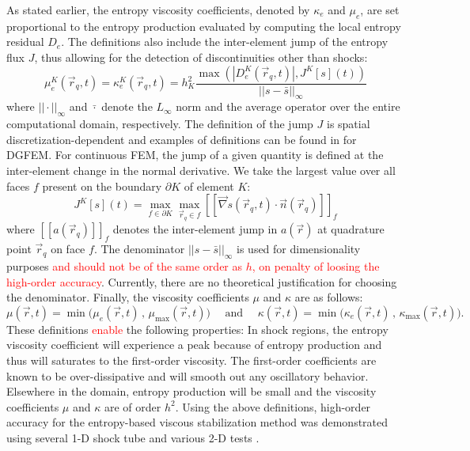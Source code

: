 \documentclass[preprint,10pt]{elsarticle}
\newcommand{\grad}{\vec{\nabla}}
\newcommand{\jmp}[1]{[\![#1]\!]}                     %
\newcommand{\tcr}[1]{\textcolor{red}{#1}}
\begin{document}
As stated earlier, the entropy viscosity coefficients, denoted by $\kappa_e$ and $\mu_e$, are set proportional to the entropy production evaluated by computing the local entropy residual $D_e$. The definitions also include the inter-element jump of the entropy flux $J$, thus allowing for the detection of discontinuities other than shocks:
%
\begin{equation}
\label{eq:ent_visc_coeff}
\mu^K_e(\vec{r}_q,t) = \kappa^K_e(\vec{r}_q,t) = h_K^2 \frac{\max\left( | D^K_e(\vec{r}_q,t) |, J^K[s](t) \right)}{|| s - \bar{s} ||_\infty} 
\end{equation}
%
where $|| \cdot ||_\infty$ and $\bar{\cdot}$ denote the $L_\infty$ norm and the average operator over the entire computational domain, respectively. The definition of the jump $J$ is spatial discretization-dependent and examples of definitions can be found in \cite{valentin} for DGFEM. For continuous FEM, the jump of a given quantity is defined at the inter-element change in the normal derivative. We take the largest value over all faces $f$ present on the boundary $\partial K$ of element $K$:
%
\begin{equation}
\label{eq:jump_CFEM}
J^K[s](t) = \max_{f\in\partial K}  \max_{\vec{r}_q \in f} \jmp{\grad s(\vec{r}_q,t) \cdot \vec{n}(\vec{r}_q) }_f
\end{equation}
%
where $\jmp{a(\vec{r}_q)}_f$ denotes the inter-element jump in $a(\vec{r})$ at quadrature point $\vec{r}_q$ on face $f$.  
The denominator $|| s - \bar{s} ||_\infty$ is used for dimensionality purposes \tcr{and should not be of the same order as $h$, on penalty of loosing the high-order accuracy}. Currently, there are no theoretical justification for choosing the denominator. 
Finally, the viscosity coefficients $\mu$ and $\kappa$ are as follows:
%
\begin{equation}
\mu(\vec{r},t)    = \min\Big( \mu_e(\vec{r},t)   \,,\, \mu_{\max}(\vec{r},t)    \Big) 
\quad \text{ and } \quad 
\kappa(\vec{r},t) = \min\Big( \kappa_e(\vec{r},t)\,,\, \kappa_{\max}(\vec{r},t) \Big).
\end{equation}
%
These definitions \tcr{enable} the following properties: 
In shock regions, the entropy viscosity coefficient will experience a peak because of entropy production and thus will saturates to the first-order viscosity. The first-order coefficients are known to be over-dissipative and will smooth out any oscillatory behavior. Elsewhere in the domain, entropy production will be small and the viscosity coefficients $\mu$ and $\kappa$ are of order $h^2$.
Using the above definitions, high-order accuracy for the entropy-based viscous stabilization method was demonstrated using several 1-D shock tube and various 2-D tests \cite{jlg1, jlg2, valentin}.
\end{document}
